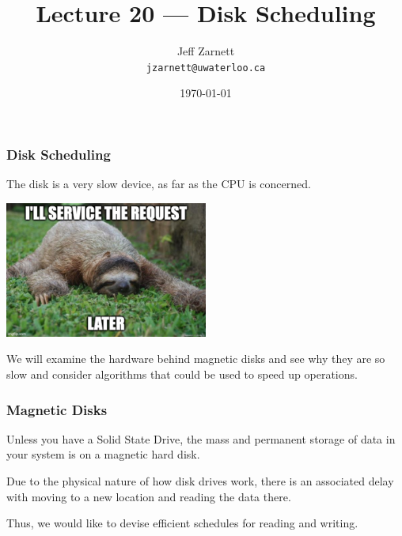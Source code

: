 

\title{Lecture 20 --- Disk Scheduling }

\author{Jeff Zarnett \\ \small \texttt{jzarnett@uwaterloo.ca}}
\date{\today}




\begin{frame}
  \titlepage

 \end{frame}



\begin{frame}
\frametitle{Disk Scheduling}

The disk is a very slow device, as far as the CPU is concerned.

\begin{center}
	\includegraphics[width=0.5\textwidth]{images/sloth.jpg}
\end{center}

We will examine the hardware behind magnetic disks and see why they are so slow and consider algorithms that could be used to speed up operations.

 \end{frame}

\begin{frame}
\frametitle{Magnetic Disks}

Unless you have a Solid State Drive, the mass and permanent storage of data in your system is on a magnetic hard disk. 

Due to the physical nature of how disk drives work, there is an associated delay with moving to a new location and reading the data there. 

Thus, we would like to devise efficient schedules for reading and writing.


\end{frame}

